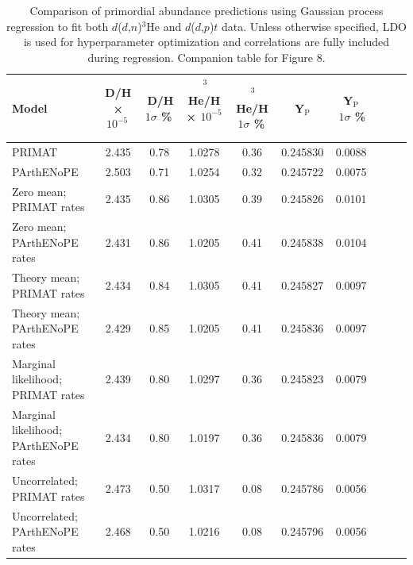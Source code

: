 \documentclass[%
 reprint,
superscriptaddress,
nofootinbib,
 amsmath,amssymb,
 aps,
 pra,
]{revtex4-2}
\begin{document}
\begin{table}[ht]
    \centering
    \caption{Comparison of primordial abundance predictions using Gaussian process regression to fit both $d$($d$,$n$)$^3$He and $d$($d$,$p$)$t$ data. Unless otherwise specified, LDO is used for hyperparameter optimization and correlations are fully included during regression. Companion table for Figure 8.}
    \small
    \begin{tabular}{l
                    S[table-format=1.6]
                    S[table-format=1.5]
                    S[table-format=1.3]
                    S[table-format=1.6]
                    S[table-format=1.5]
                    S[table-format=1.3]
                    S[table-format=1.6]
                    S[table-format=1.7]
                    S[table-format=1.4]} 
     \toprule
    {Model} & {D/H × $10^{-5}$\,} & {\,D/H $1\sigma$ \%\,} &
    {\,$^3$He/H × $10^{-5}$\,} & {\,$^3$He/H $1\sigma$ \%\,} &
    {\,Y$_\text{P}$\,} & {\,Y$_\text{P}\,$ $\,1\sigma$ \%} \\
    \midrule
    PRIMAT & 2.435 & 0.78 & 1.0278 & 0.36 & 0.245830 & 0.0088 \\
    PArthENoPE & 2.503 & 0.71 & 1.0254 & 0.32 & 0.245722 & 0.0075 \\
    Zero mean; PRIMAT rates & 2.435 & 0.86 & 1.0305 & 0.39 & 0.245826 & 0.0101 \\
    Zero mean; PArthENoPE rates & 2.431 & 0.86 & 1.0205 & 0.41 & 0.245838 & 0.0104 \\
    Theory mean; PRIMAT rates & 2.434 & 0.84 & 1.0305 & 0.41 & 0.245827 & 0.0097 \\
    Theory mean; PArthENoPE rates & 2.429 & 0.85 & 1.0205 & 0.41 & 0.245836 & 0.0097 \\
    Marginal likelihood; PRIMAT rates & 2.439 & 0.80 & 1.0297 & 0.36 & 0.245823 & 0.0079 \\
    Marginal likelihood; PArthENoPE rates & 2.434 & 0.80 & 1.0197 & 0.36 & 0.245836 & 0.0079 \\
    Uncorrelated; PRIMAT rates & 2.473 & 0.50 & 1.0317 & 0.08 & 0.245786 & 0.0056 \\
    Uncorrelated; PArthENoPE rates & 2.468 & 0.50 & 1.0216 & 0.08 & 0.245796 & 0.0056 \\
    \bottomrule
    \end{tabular}
\end{table}
\end{document}
